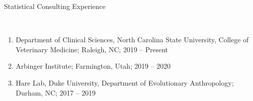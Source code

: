 \documentclass[12pt]{article}
\newcommand{\head}[1]{ %
    \bigskip %
    \begin{large}\begin{bf}{#1}\end{bf}\end{large} %

    \ \\ [-1.3cm] %

    \hrulefill}
\begin{document}
\head{Statistical Consulting Experience}

\begin{enumerate}[label=$\bullet$]

\item Department of Clinical Sciences, North Carolina State University, College of Veterinary Medicine; Raleigh, NC; 2019 -- Present

\item Arbinger Institute; Farmington, Utah; 2019 -- 2020


\item Hare Lab, Duke University, Department of Evolutionary Anthropology; Durham, NC; 2017 -- 2019

\end{enumerate}
\end{document}
